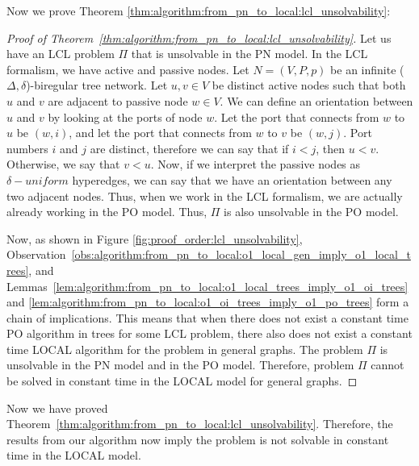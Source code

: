 Now we prove Theorem \ref{thm:algorithm:from_pn_to_local:lcl_unsolvability}:
\begin{proof}[Proof of Theorem~\ref{thm:algorithm:from_pn_to_local:lcl_unsolvability}]
    Let us have an LCL problem $\Pi$ that is unsolvable in the PN model.
    In the LCL formalism, we have active and passive nodes.
    Let $N = (V, P, p)$ be an infinite ($\Delta, \delta$)-biregular tree network.
    Let $u, v \in V$ be distinct active nodes such that both $u$ and $v$ are adjacent to passive node $w\in V$.
    We can define an orientation between $u$ and $v$ by looking at the ports of node $w$.
    Let the port that connects from $w$ to $u$ be $(w, i)$, and let the port that connects from $w$ to $v$ be $(w, j)$.
    Port numbers $i$ and $j$ are distinct, therefore we can say that if $i < j$, then $u < v$.
    Otherwise, we say that $v < u$.
    Now, if we interpret the passive nodes as $\delta-uniform$ hyperedges, we can say that we have an orientation between any two adjacent nodes.
    Thus, when we work in the LCL formalism, we are actually already working in the PO model.
    Thus, $\Pi$ is also unsolvable in the PO model.

    Now, as shown in Figure \ref{fig:proof_order:lcl_unsolvability}, Observation~\ref{obs:algorithm:from_pn_to_local:o1_local_gen_imply_o1_local_trees}, and Lemmas~\ref{lem:algorithm:from_pn_to_local:o1_local_trees_imply_o1_oi_trees} and \ref{lem:algorithm:from_pn_to_local:o1_oi_trees_imply_o1_po_trees} form a chain of implications.
    This means that when there does not exist a constant time PO algorithm in trees for some LCL problem, there also does not exist a constant time LOCAL algorithm for the problem in general graphs.
    The problem $\Pi$ is unsolvable in the PN model and in the PO model.
    Therefore, problem $\Pi$ cannot be solved in constant time in the LOCAL model for general graphs.
\end{proof}



Now we have proved Theorem~\ref{thm:algorithm:from_pn_to_local:lcl_unsolvability}.
Therefore, the results from our algorithm now imply the problem is not solvable in constant time in the LOCAL model.
